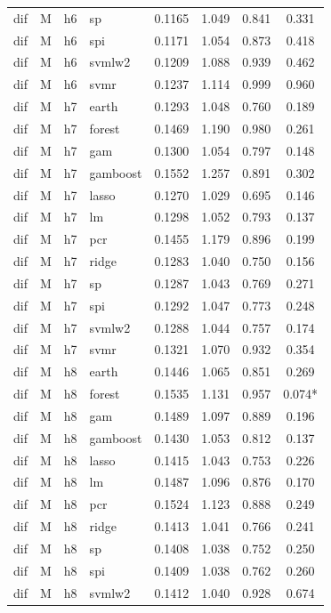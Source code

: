 \begin{ThreePartTable}
\begin{longtable}[t]{llclcccc}
dif & M & h6 & sp & 0.1165 & 1.049 & 0.841 & 0.331\\
dif & M & h6 & spi & 0.1171 & 1.054 & 0.873 & 0.418\\
dif & M & h6 & svmlw2 & 0.1209 & 1.088 & 0.939 & 0.462\\
dif & M & h6 & svmr & 0.1237 & 1.114 & 0.999 & 0.960\\
\addlinespace
dif & M & h7 & earth & 0.1293 & 1.048 & 0.760 & 0.189\\
dif & M & h7 & forest & 0.1469 & 1.190 & 0.980 & 0.261\\
dif & M & h7 & gam & 0.1300 & 1.054 & 0.797 & 0.148\\
dif & M & h7 & gamboost & 0.1552 & 1.257 & 0.891 & 0.302\\
dif & M & h7 & lasso & 0.1270 & 1.029 & 0.695 & 0.146\\
dif & M & h7 & lm & 0.1298 & 1.052 & 0.793 & 0.137\\
dif & M & h7 & pcr & 0.1455 & 1.179 & 0.896 & 0.199\\
dif & M & h7 & ridge & 0.1283 & 1.040 & 0.750 & 0.156\\
dif & M & h7 & sp & 0.1287 & 1.043 & 0.769 & 0.271\\
dif & M & h7 & spi & 0.1292 & 1.047 & 0.773 & 0.248\\
dif & M & h7 & svmlw2 & 0.1288 & 1.044 & 0.757 & 0.174\\
dif & M & h7 & svmr & 0.1321 & 1.070 & 0.932 & 0.354\\
\addlinespace
dif & M & h8 & earth & 0.1446 & 1.065 & 0.851 & 0.269\\
dif & M & h8 & forest & 0.1535 & 1.131 & 0.957 & 0.074*\\
dif & M & h8 & gam & 0.1489 & 1.097 & 0.889 & 0.196\\
dif & M & h8 & gamboost & 0.1430 & 1.053 & 0.812 & 0.137\\
dif & M & h8 & lasso & 0.1415 & 1.043 & 0.753 & 0.226\\
dif & M & h8 & lm & 0.1487 & 1.096 & 0.876 & 0.170\\
dif & M & h8 & pcr & 0.1524 & 1.123 & 0.888 & 0.249\\
dif & M & h8 & ridge & 0.1413 & 1.041 & 0.766 & 0.241\\
dif & M & h8 & sp & 0.1408 & 1.038 & 0.752 & 0.250\\
dif & M & h8 & spi & 0.1409 & 1.038 & 0.762 & 0.260\\
dif & M & h8 & svmlw2 & 0.1412 & 1.040 & 0.928 & 0.674\\

\end{longtable}
\end{ThreePartTable}

